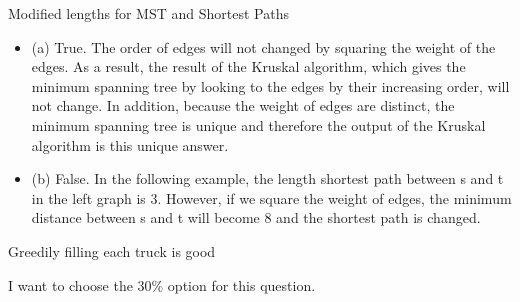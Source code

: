 \documentclass[12pt]{article}
\newenvironment{solution}[2][Solution]{\begin{trivlist}
\item[\hskip \labelsep {\bfseries #1}]}{\end{trivlist}}
\newenvironment{problem}[2][Problem]{\begin{trivlist}
\item[\hskip \labelsep {\bfseries #1}\hskip \labelsep {\bfseries #2.}]}{\end{trivlist}}
\begin{document}
\begin{problem}{3}
Modified lengths for MST and Shortest Paths
\end{problem}

\begin{solution}{}
\begin{itemize}
\item (a) True. The order of edges will not changed by squaring the weight of the edges.
As a result, the result of the Kruskal algorithm, which gives the minimum spanning tree by
looking to the edges by their increasing order, will not change. In addition, because the
weight of edges are distinct, the minimum spanning tree is unique and therefore the output
of the Kruskal algorithm is this unique answer.
\item (b) False. In the following example, the length shortest path between s and t in the
left graph is 3. However, if we square the weight of edges, the minimum distance between s
and t will become 8 and the shortest path is changed.
\end{itemize}
\end{solution}

\begin{problem}{4}
Greedily filling each truck is good
\end{problem}

\begin{solution}{}
I want to choose the 30\% option for this question.
\end{solution}

\pagebreak
\end{document}
